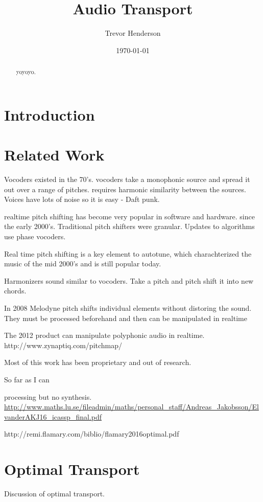 \documentclass[12pt]{article}
\title{Audio Transport}
\date{\today}
\author{Trevor Henderson}
\begin{document}
\maketitle

\begin{abstract}
  yoyoyo.
\end{abstract}

\section{Introduction}

\section{Related Work}
Vocoders existed in the 70's.
vocoders take a monophonic source and spread it out over a range of pitches. requires harmonic similarity between the sources. Voices have lots of noise so it is easy - Daft punk. 

realtime pitch shifting has become very popular in software and hardware. since the early 2000's.
Traditional pitch shifters were granular.
Updates to algorithms use phase vocoders.

Real time pitch shifting is a key element to autotune, which charachterized the music of the mid 2000's and is still popular today.

Harmonizers sound similar to vocoders. Take a pitch and pitch shift it into new chords.

In 2008 Melodyne pitch shifts individual elements without distoring the sound.
They must be processed beforehand and then can be manipulated in realtime

The 2012 product can manipulate polyphonic audio in realtime.
http://www.zynaptiq.com/pitchmap/

Most of this work has been proprietary and out of research. 

So far as I can 

processing but no synthesis.
\url{http://www.maths.lu.se/fileadmin/maths/personal_staff/Andreas_Jakobsson/ElvanderAKJ16_icassp_final.pdf}

http://remi.flamary.com/biblio/flamary2016optimal.pdf

\section{Optimal Transport}

Discussion of optimal transport.
\end{document}
